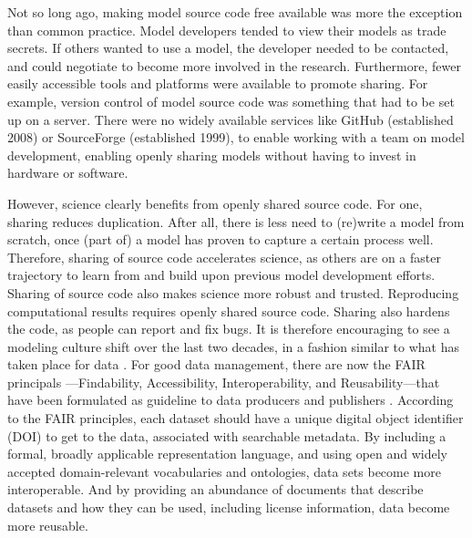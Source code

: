 \documentclass[12pt]{amsart}
\begin{document}
Not so long ago, making model source code free available was more the exception than common practice. Model developers tended to view their models as trade secrets. If others wanted to use a model, the developer needed to be contacted, and could negotiate to become more involved in the research. Furthermore, fewer easily accessible tools and platforms were available to promote sharing. For example, version control of model source code was something that had to be set up on a server. There were no widely available services like GitHub (established 2008) or SourceForge (established 1999), to enable working with a team on model development, enabling openly sharing models without having to invest in hardware or software.

However, science clearly benefits from openly shared source code. For one, sharing reduces duplication. After all, there is less need to (re)write a model from scratch, once (part of) a model has proven to capture a certain process well. Therefore, sharing of source code accelerates science, as others are on a faster trajectory to learn from and build upon previous model development efforts. Sharing of source code also makes science more robust and trusted. Reproducing computational results requires openly shared source code. Sharing also hardens the code, as people can report and fix bugs. It is therefore encouraging to see a modeling culture shift over the last two decades, in a fashion similar to what has taken place for data \citep[e.g.,][]{hsu2015data}. For good data management, there are now the FAIR principals ---Findability, Accessibility, Interoperability, and Reusability---that have been formulated as guideline to data producers and publishers \citep{wilkinson2016fair}. According to the FAIR principles, each dataset should have a unique digital object identifier (DOI) to get to the data, associated with searchable metadata. By including a formal, broadly applicable representation language, and using open and widely accepted domain-relevant vocabularies and ontologies, data sets become more interoperable. And by providing an abundance of documents that describe datasets and how they can be used, including license information, data become more reusable.
\end{document}

